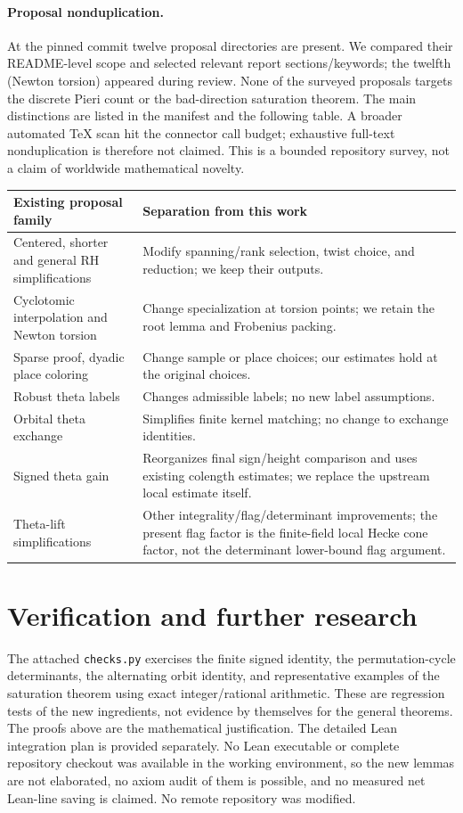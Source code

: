 \documentclass[11pt]{article}
\theoremstyle{remark}\newtheorem{remark}[theorem]{Remark}
\newcommand{\code}[1]{\texttt{#1}}
\begin{document}
\paragraph{Proposal nonduplication.} At the pinned commit twelve proposal directories are present. We compared their README-level scope and selected relevant report sections/keywords; the twelfth (Newton torsion) appeared during review. None of the surveyed proposals targets the discrete Pieri count or the bad-direction saturation theorem. The main distinctions are listed in the manifest and the following table. A broader automated TeX scan hit the connector call budget; exhaustive full-text nonduplication is therefore not claimed. This is a bounded repository survey, not a claim of worldwide mathematical novelty.
\begin{center}\small
\begin{tabular}{p{.44\linewidth}p{.45\linewidth}}\toprule
Existing proposal family & Separation from this work\\\midrule
Centered, shorter and general RH simplifications & Modify spanning/rank selection, twist choice, and reduction; we keep their outputs.\\
Cyclotomic interpolation and Newton torsion & Change specialization at torsion points; we retain the root lemma and Frobenius packing.\\
Sparse proof, dyadic place coloring & Change sample or place choices; our estimates hold at the original choices.\\
Robust theta labels & Changes admissible labels; no new label assumptions.\\
Orbital theta exchange & Simplifies finite kernel matching; no change to exchange identities.\\
Signed theta gain & Reorganizes final sign/height comparison and uses existing colength estimates; we replace the upstream local estimate itself.\\
Theta-lift simplifications & Other integrality/flag/determinant improvements; the present flag factor is the finite-field local Hecke cone factor, not the determinant lower-bound flag argument.\\\bottomrule
\end{tabular}
\end{center}

\section{Verification and further research}
The attached \code{checks.py} exercises the finite signed identity, the permutation-cycle determinants, the alternating orbit identity, and representative examples of the saturation theorem using exact integer/rational arithmetic. These are regression tests of the new ingredients, not evidence by themselves for the general theorems. The proofs above are the mathematical justification. The detailed Lean integration plan is provided separately. No Lean executable or complete repository checkout was available in the working environment, so the new lemmas are not elaborated, no axiom audit of them is possible, and no measured net Lean-line saving is claimed. No remote repository was modified.
\end{document}
